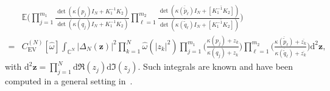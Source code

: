 \documentclass[pdflatex,sn-mathphys-num]{sn-jnl}
\theoremstyle{thmstyleone}
\numberwithin{equation}{section}
\newcommand{\C}{\mathbb{C}}
\begin{document}
\begin{align}\label{partitionfunction2.b}
    &\mathbb{E}\Bigg(\prod_{j=1}^{m_{1}}\frac{\det\left ( \kappa\left ( p_{j} \right )I_{N}+K_{1}^{-1}K_{2} \right )}{\det\left ( \kappa\left ( q_{j} \right )I_{N}+K_{1}^{-1}K_{2} \right )}\prod_{\ell=1}^{m_{2}}\frac{\det\left ( \overline{\kappa\left ( \widetilde{p}_{\ell} \right )}I_{N}+\overline{\left [K_{1}^{-1}K_{2}  \right ]} \right )}{\det\left ( \overline{\kappa\left ( \widetilde{q}_{\ell} \right )}I_{N}+\overline{\left [K_{1}^{-1}K_{2}  \right ]} \right )}\Bigg) \nonumber
    \\
    =&C^{\left ( N \right )}_{\mathrm{EV}}\left [ \widehat{\omega} \right ]\int_{\C^{N}}^{}\left | \Delta_{N}\left ( \mathbf{z} \right ) \right |^{2}\prod\limits_{k=1}^{N}\widehat{\omega}\left ( \left | z_{k} \right |^{2} \right )\prod\limits_{j=1}^{m_{1}}\Bigg(\frac{\kappa\left ( p_{j} \right )+z_{k} }{\kappa\left ( q_{j} \right ) +z_{k} }\Bigg)\prod\limits_{\ell=1}^{m_{2}}\Bigg(\frac{ \overline{\kappa\left ( \widetilde{p}_{\ell} \right )}+\overline{z_{k}} }{\overline{\kappa\left ( \widetilde{q}_{\ell} \right )} +\overline{z_{k}} }\Bigg)\mathrm{d}^{2}\mathbf{z},
\end{align}
with $\mathrm{d}^{2}\mathbf{z}=\prod\limits_{j=1}^{N}\mathrm{d}\Re\left( z_{j} \right)\mathrm{d}\Im\left( z_{j} \right)$.
Such integrals are known and have been computed in a general setting in~\cite[Eq.~(4.18)]{kieburgDerivationDeterminantalStructures2010}.
\end{document}
